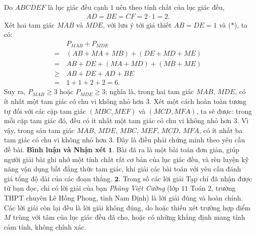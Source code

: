 \begin{multicols}{2}
\begin{figure}[H]
		\vspace*{-15pt}
	\end{figure}
	Do $ABCDEF$ là lục giác đều cạnh $1$ nên theo tính chất của lục giác đều,
	\begin{align*}
		AD = BE = CF = 2 \cdot 1 = 2. \tag{$*$}
	\end{align*}
	Xét hai tam giác $MAB$ và $MDE$, với lưu ý tới giả thiết $AB = DE = 1$ và ($*$), ta có:
	\begin{align*}
			&{P_{MAB}} + {P_{MDE}} \\[-0.5ex]
			= \,&\left( {AB + MA + MB} \right) + \left( {DE + MD + ME} \right)\\[-0.5ex]
			 = \,&AB + DE + \left( {MA + MD} \right) + \left( {MB + ME} \right)\\[-0.5ex]
			 \ge \,&AB + DE + AD + BE\\[-0.5ex]
			 = \,&1 + 1 + 2 + 2 = 6.
	\end{align*}
	Suy ra, $P_{MAB} \ge 3$  hoặc $P_{MDE} \ge 3$; nghĩa là, trong hai tam giác $MAB$, $MDE$, có ít nhất một tam giác có chu vi không nhỏ hơn $3$.
	\vskip 0.05cm
	Xét một cách hoàn toàn tương tự đối với các cặp tam giác $(MBC, MEF)$ và $(MCD, MFA)$, ta sẽ được: trong mỗi cặp tam giác đó, đều có ít nhất một tam giác có chu vi không nhỏ hơn $3$.
	\vskip 0.05cm
	Vì vậy, trong sáu tam giác $MAB$, $MDE$, $MBC$, $MEF$, $MCD$, $MFA$, có ít nhất ba tam giác có chu vi không nhỏ hơn $3$. Đây là điều phải chứng minh theo yêu cầu đề bài.
	\vskip 0.05cm
	\textbf{\color{thachthuctoanhoc}Bình luận và Nhận xét}
	\vskip 0.05cm
	$\pmb{1.}$ Bài đã ra là một bài toán đơn giản, giúp người giải bài ghi nhớ một tính chất rất cơ bản của lục giác đều, và rèn luyện kỹ năng vận dụng bất đẳng thức tam giác, khi giải các bài toán với yêu cầu đánh giá tổng độ dài của các đoạn thẳng.
	\vskip 0.05cm
	$\pmb{2.}$ Trong số các lời giải Tạp chí đã nhận được từ bạn đọc, chỉ có lời giải của bạn \textit{Phùng Việt Cường} (lớp $11$ Toán $2$, trường THPT chuyên Lê Hồng Phong, tỉnh Nam Định) là lời giải đúng và hoàn chỉnh. Các lời giải còn lại đều là lời giải không đúng, do hoặc thiếu xét trường hợp điểm $M$ trùng với tâm của lục giác đều đã cho, hoặc có những khẳng định mang tính cảm tính, không chính xác.

\end{multicols}
